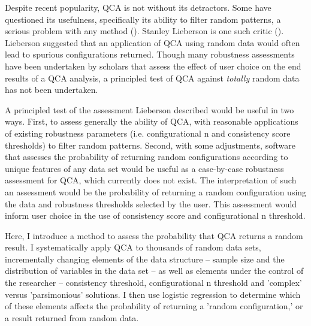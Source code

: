 \documentclass[]{article}
\begin{document}


Despite recent popularity, QCA is not without its detractors. Some have questioned its usefulness, specifically its ability to filter random patterns, a serious problem with any method (). Stanley Lieberson is one such critic (). Lieberson suggested that an application of QCA using random data would often lead to spurious configurations returned. Though many robustness assessments have been undertaken by scholars that assess the effect of user choice on the end results of a QCA analysis, a principled test of QCA against \emph{totally} random data has not been undertaken. 


A principled test of the assessment Lieberson described would be useful in two ways. First, to assess generally the ability of QCA, with reasonable applications of existing robustness parameters (i.e. configurational n and consistency score thresholds) to filter random patterns. Second, with some adjustments, software that assesses the probability of returning random configurations according to unique features of any data set would be useful as a case-by-case robustness assessment for QCA, which currently does not exist. The interpretation of such an assessment would be the probability of returning a random configuration using the data and robustness thresholds selected by the user. This assessment would inform user choice in the use of consistency score and configurational n threshold.


Here, I introduce a method to assess the probability that QCA returns a random result. I systematically apply QCA to thousands of random data sets, incrementally changing elements of the data structure -- sample size and the distribution of variables in the data set -- as well as elements under the control of the researcher -- consistency threshold, configurational n threshold and 'complex' versus 'parsimonious' solutions. I then use logistic regression to determine which of these elements affects the probability of returning a 'random configuration,' or a result returned from random data. 
\end{document}
